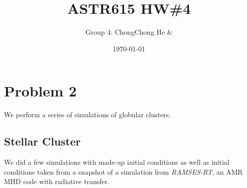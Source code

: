 
\usepackage{graphicx}



\title{ASTR615 HW\#4}
\author{Group 4: ChongChong He \& }
\date{\today}
\maketitle

\section*{Problem 2}
We perform a series of simulations of globular clusters.

\subsection*{Stellar Cluster}
We did a few simulations with made-up initial conditions as well as initial conditions taken 
from a snapshot of a simulation from \textit{RAMSES-RT}, an AMR MHD code with 
radiative transfer.

